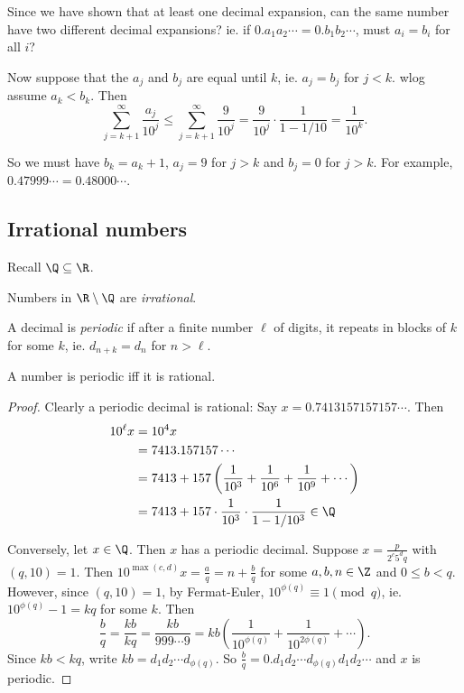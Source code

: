 \documentclass[a4paper]{article}
\begin{document}
  Since we have shown that at least one decimal expansion, can the same number have two different decimal expansions? ie. if $0.a_1a_2\cdots = 0.b_1b_2\cdots$, must $a_i = b_i$ for all $i$?

  Now suppose that the $a_j$ and $b_j$ are equal until $k$, ie. $a_j = b_j$ for $j < k$. wlog assume $a_k < b_k$. Then
  \[
    \sum_{j = k + 1}^\infty \frac{a_j}{10^j} \leq \sum_{j = k+1}^\infty \frac{9}{10^j} = \frac{9}{10^j}\cdot \frac{1}{1 - 1/10} = \frac{1}{10^k}.
  \]

  So we must have $b_k = a_k + 1$, $a_j = 9$ for $j > k$ and $b_j = 0$ for $j > k$. For example, $0.47999\cdots = 0.48000\cdots$.

  \subsection{Irrational numbers}
  Recall $\Q\subseteq \R$.
  \begin{defi}
    Numbers in $\R\setminus \Q$ are \emph{irrational}.
  \end{defi}

  \begin{defi}
    A decimal is \emph{periodic} if after a finite number $\ell$ of digits, it repeats in blocks of $k$ for some $k$, ie. $d_{n + k} = d_n$ for $n > \ell$.
  \end{defi}

  \begin{prop}
    A number is periodic iff it is rational.
  \end{prop}

  \begin{proof}
    Clearly a periodic decimal is rational: Say $x = 0.7413157157157\cdots$. Then
    \begin{align*}
      10^\ell x &= 10^4x\\
      &= 7413.157157\cdots \\
      &= 7413 + 157\left(\frac{1}{10^3} + \frac{1}{10^6} + \frac{1}{10^9} + \cdots\right)\\
      &= 7413 + 157\cdot \frac{1}{10^3}\cdot \frac{1}{1 - 1/10^3}\in \Q
    \end{align*}

    Conversely, let $x\in \Q$. Then $x$ has a periodic decimal. Suppose $x = \frac{p}{2^c5^dq}$ with $(q, 10) = 1$. Then $10^{\max(c, d)}x = \frac{a}{q} = n + \frac{b}{q}$ for some $a, b, n\in \Z$ and $0\leq b < q$. However, since $(q, 10) = 1$, by Fermat-Euler, $10^{\phi(q)}\equiv 1\pmod q$, ie. $10^{\phi(q)} - 1 = kq$ for some $k$. Then 
    \[
      \frac{b}{q} = \frac{kb}{kq} = \frac{kb}{999\cdots 9} = kb\left(\frac{1}{10^{\phi(q)}} + \frac{1}{10^{2\phi(q)}} + \cdots \right).
    \]
    Since $kb < kq$, write $kb = d_1d_2\cdots d_{\phi(q)}$. So $\frac{b}{q} = 0.d_1d_2\cdots d_{\phi(q)}d_1d_2\cdots$ and $x$ is periodic.
  \end{proof}
\end{document}
